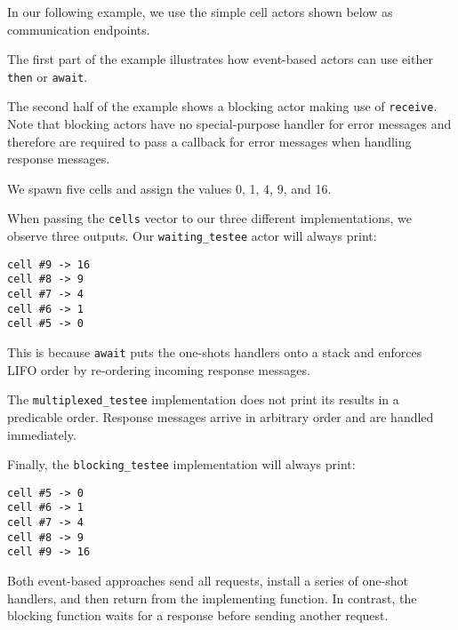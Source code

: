 In our following example, we use the simple cell actors shown below as
communication endpoints.


The first part of the example illustrates how event-based actors can use either
\lstinline^then^ or \lstinline^await^.


\clearpage

The second half of the example shows a blocking actor making use of
\lstinline^receive^. Note that blocking actors have no special-purpose handler
for error messages and therefore are required to pass a callback for error
messages when handling response messages.


We spawn five cells and assign the values 0, 1, 4, 9, and 16.


When passing the \lstinline^cells^ vector to our three different
implementations, we observe three outputs. Our \lstinline^waiting_testee^ actor
will always print:

\begin{footnotesize}
\begin{verbatim}
cell #9 -> 16
cell #8 -> 9
cell #7 -> 4
cell #6 -> 1
cell #5 -> 0
\end{verbatim}
\end{footnotesize}

This is because \lstinline^await^ puts the one-shots handlers onto a stack and
enforces LIFO order by re-ordering incoming response messages.

The \lstinline^multiplexed_testee^ implementation does not print its results in
a predicable order. Response messages arrive in arbitrary order and are handled
immediately.

Finally, the \lstinline^blocking_testee^ implementation will always print:

\begin{footnotesize}
\begin{verbatim}
cell #5 -> 0
cell #6 -> 1
cell #7 -> 4
cell #8 -> 9
cell #9 -> 16
\end{verbatim}
\end{footnotesize}

Both event-based approaches send all requests, install a series of one-shot
handlers, and then return from the implementing function. In contrast, the
blocking function waits for a response before sending another request.

